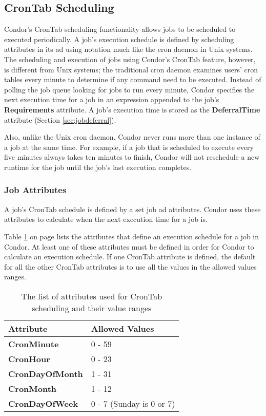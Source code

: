 \documentclass[a4paper, 11pt]{article}
\newcommand{\SubmitCmd}[1]{\textbf{#1}}		%
\begin{document}
\subsection{CronTab Scheduling}
\label{sec:crontab}
Condor's CronTab scheduling functionality allows jobs to be scheduled to executed periodically. A job's execution schedule is defined by scheduling attributes in its ad using notation much like the cron daemon in Unix systems. The scheduling and execution of jobs using Condor's CronTab feature, however, is different from Unix systems; the traditional cron daemon examines users' cron tables every minute to determine if any command need to be executed. Instead of polling the job queue looking for jobs to run every minute, Condor specifies the next execution time for a job in an expression appended to the job's \SubmitCmd{Requirements} attribute. A job's execution time is stored as the \SubmitCmd{DeferralTime} attribute (Section \ref{sec:jobdeferral}).

Also, unlike the Unix cron daemon, Condor never runs more than one instance of a job at the same time. For example, if a job that is scheduled to execute every five minutes always takes ten minutes to finish, Condor will not reschedule a new runtime for the job until the job's last execution completes.

\subsubsection{Job Attributes}
\label{sec:crontab-attributes}
A job's CronTab schedule is defined by a set job ad attributes. Condor uses these attributes to calculate when the next execution time for a job is.

Table \ref{tab:crontab-attributes} on page \pageref{tab:crontab-attributes} lists the attributes that define an execution schedule for a job in Condor. At least one of these attributes must be defined in order for Condor to calculate an execution schedule. If one CronTab attribute is defined, the default for all the other CronTab attributes is to use all the values in the allowed values ranges.

\begin{table}
   \begin{center}
   \begin{tabular}{ll}
   Attribute & Allowed Values \\
   \hline
   \SubmitCmd{CronMinute} & 0 - 59 \\
   \SubmitCmd{CronHour} & 0 - 23 \\
   \SubmitCmd{CronDayOfMonth} & 1 - 31 \\
   \SubmitCmd{CronMonth} & 1 - 12 \\
   \SubmitCmd{CronDayOfWeek} & 0 - 7 (Sunday is 0 or 7)\\
   \end{tabular}
   \end{center}
   \caption{The list of attributes used for CronTab scheduling and their value ranges}
   \label{tab:crontab-attributes}
\end{table}
\end{document}
